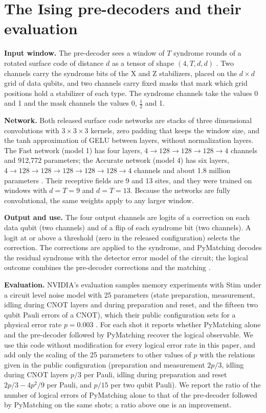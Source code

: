 \section{The Ising pre-decoders and their evaluation}\label{sec:background}

\textbf{Input window.} The pre-decoder sees a window of $T$ syndrome rounds of a rotated surface code of distance $d$
as a tensor of shape $(4, T, d, d)$ \cite{chamberland2026predecoder}. Two channels carry the syndrome bits of the X
and Z stabilizers, placed on the $d\times d$ grid of data qubits, and two channels carry fixed masks that mark which
grid positions hold a stabilizer of each type. The syndrome channels take the values 0 and 1 and the mask channels
the values 0, $\tfrac12$ and 1.

\textbf{Network.} Both released surface code networks are stacks of three dimensional convolutions with $3\times
3\times 3$ kernels, zero padding that keeps the window size, and the tanh approximation of GELU
\cite{hendrycks2016gelu} between layers, without normalization layers. The Fast network (model 1) has four layers,
$4\to128\to128\to128\to4$ channels and 912{,}772 parameters; the Accurate network (model 4) has six layers,
$4\to128\to128\to128\to128\to128\to4$ channels and about 1.8 million parameters \cite{nvidia_fast_card,
nvidia_accurate_card}. Their receptive fields are 9 and 13 sites, and they were trained on windows with $d=T=9$ and
$d=T=13$. Because the networks are fully convolutional, the same weights apply to any larger window.

\textbf{Output and use.} The four output channels are logits of a correction on each data qubit (two channels) and
of a flip of each syndrome bit (two channels). A logit at or above a threshold (zero in the released configuration)
selects the correction. The corrections are applied to the syndrome, and PyMatching decodes the residual syndrome
with the detector error model of the circuit; the logical outcome combines the pre-decoder corrections and the
matching \cite{chamberland2026predecoder,higgott2025sparse}.

\textbf{Evaluation.} NVIDIA's evaluation samples memory experiments with Stim \cite{gidney2021stim} under a circuit
level noise model with 25 parameters (state preparation, measurement, idling during CNOT layers and during
preparation and reset, and the fifteen two qubit Pauli errors of a CNOT), which their public configuration sets for a
physical error rate $p=0.003$ \cite{nvidia_ising_code}. For each shot it reports whether PyMatching alone and the
pre-decoder followed by PyMatching recover the logical observable. We use this code without modification for every
logical error rate in this paper, and add only the scaling of the 25 parameters to other values of $p$ with the
relations given in the public configuration (preparation and measurement $2p/3$, idling during CNOT layers $p/3$ per
Pauli, idling during preparation and reset $2p/3-4p^2/9$ per Pauli, and $p/15$ per two qubit Pauli). We report the
ratio of the number of logical errors of PyMatching alone to that of the pre-decoder followed by PyMatching on the
same shots; a ratio above one is an improvement.
